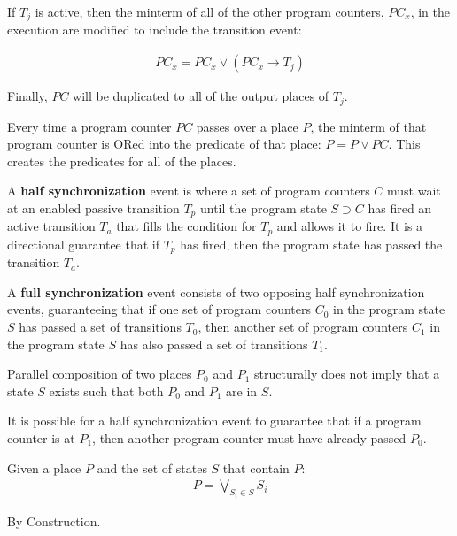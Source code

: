 If $T_j$ is active, then the minterm of all of the other program counters, $PC_x$, in the execution are modified to include the transition event:

\begin{align}
PC_x = PC_x \vee (PC_x \rightarrow T_j)
\end{align}

Finally, $PC$ will be duplicated to all of the output places of $T_j$.

Every time a program counter $PC$ passes over a place $P$, the minterm of that program counter is ORed into the predicate of that place: $P = P \vee PC$. This creates the predicates for all of the places.

\begin{definition}
A \textbf{half synchronization} event is where a set of program counters $C$ must wait at an enabled passive transition $T_p$ until the program state $S \supset C$ has fired an active transition $T_a$ that fills the condition for $T_p$ and allows it to fire. It is a directional guarantee that if $T_p$ has fired, then the program state has passed the transition $T_a$.
\end{definition}

\begin{definition}
A \textbf{full synchronization} event consists of two opposing half synchronization events, guaranteeing that if one set of program counters $C_0$ in the program state $S$ has passed a set of transitions $T_0$, then another set of program counters $C_1$ in the program state $S$ has also passed a set of transitions $T_1$.
\end{definition}

\begin{lemma}
Parallel composition of two places $P_0$ and $P_1$ structurally does not imply that a state $S$ exists such that both $P_0$ and $P_1$ are in $S$.

It is possible for a half synchronization event to guarantee that if a program counter is at $P_1$, then another program counter must have already passed $P_0$.
\end{lemma}

\begin{lemma}
Given a place $P$ and the set of states $S$ that contain $P$:
\begin{align}
P = \bigvee_{S_i \in S} S_i
\end{align}

By Construction.
\end{lemma}

